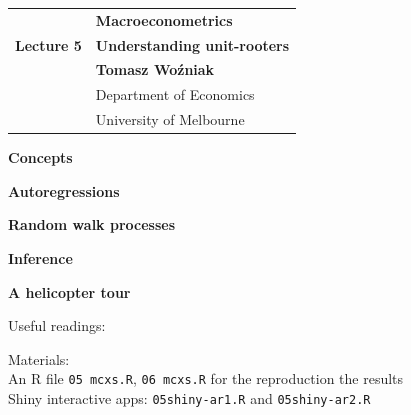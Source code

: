 \documentclass[notes,blackandwhite,mathsans]{beamer}
\begin{document}






{
\begin{frame}

\vspace{1cm}
\begin{tabular}{rl}
&\textbf{\LARGE\color{mcxs2} Macroeconometrics}\\[8ex]
\textbf{\Large Lecture 5}&\textbf{\Large\color{mcxs2}Understanding unit-rooters}\\[19ex]
&\textbf{Tomasz Wo\'zniak}\\[1ex]
&{\small\color{mcxs2} Department of Economics}\\
&{\small\color{mcxs2}University of Melbourne}
\end{tabular}

\end{frame}
}



{
\begin{frame}

\vspace{1cm} \textbf{\color{mcxs2}Concepts}

\bigskip\textbf{\color{mcxs2}Autoregressions}

\bigskip\textbf{\color{mcxs1}Random walk processes}

\bigskip\textbf{\color{mcxs1}Inference}

\bigskip\textbf{\color{mcxs1}A helicopter tour}


\small
\vspace{1cm} Useful readings: \\ \footnotesize
{}

\bigskip\normalsize Materials:\\[1ex] \footnotesize
{\color{mcxs2}An R file} \texttt{05 mcxs.R}, \texttt{06 mcxs.R} {\color{mcxs2}for the reproduction the results}\\
{\color{mcxs2}Shiny interactive apps:} \texttt{05shiny-ar1.R} {\color{mcxs2}and} \texttt{05shiny-ar2.R}

\end{frame}
}
\end{document}
